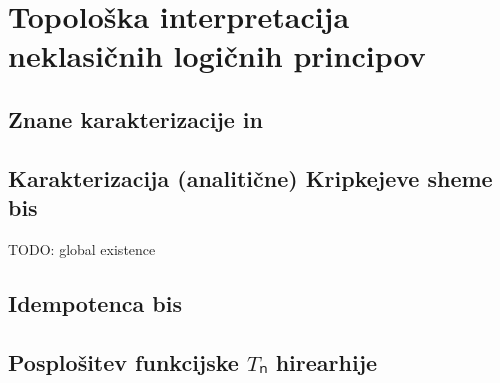 \section{Topološka interpretacija neklasičnih logičnih principov}

\subsection{Znane karakterizacije \lem* in \lpo*}
\subsection{Karakterizacija (analitične) Kripkejeve sheme bis}
TODO: global existence
\subsection{Idempotenca \lpo* bis}
\subsection{Posplošitev funkcijske \(Tₙ\) hirearhije}


